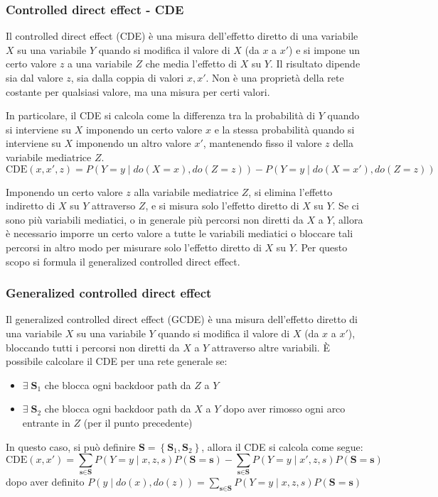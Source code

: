 \subsubsection*{Controlled direct effect - CDE}
Il controlled direct effect (CDE) è una misura dell'effetto diretto di una variabile \(X\) su una variabile \(Y\) quando si
modifica il valore di \(X\) (da \(x\) a \(x'\)) e si impone un certo valore \(z\) a una variabile \(Z\) che media l'effetto
di \(X\) su \(Y\). Il risultato dipende sia dal valore \(z\), sia dalla coppia di valori \(x, x'\). Non è una proprietà della
rete costante per qualsiasi valore, ma una misura per certi valori.

In particolare, il CDE si calcola come la differenza tra la probabilità di \(Y\) quando si interviene su \(X\) imponendo un
certo valore \(x\) e la stessa probabilità quando si interviene su \(X\) imponendo un altro valore \(x'\), mantenendo fisso
il valore \(z\) della variabile mediatrice \(Z\).
\[\text{CDE}(x, x',z) = P(Y = y \mid do(X = x), do(Z = z)) - P(Y = y \mid do(X = x'), do(Z = z))\]

Imponendo un certo valore \(z\) alla variabile mediatrice \(Z\), si elimina l'effetto indiretto di \(X\) su \(Y\) attraverso
\(Z\), e si misura solo l'effetto diretto di \(X\) su \(Y\). Se ci sono più variabili mediatici, o in generale più percorsi
non diretti da \(X\) a \(Y\), allora è necessario imporre un certo valore a tutte le variabili mediatici o bloccare tali
percorsi in altro modo per misurare solo l'effetto diretto di \(X\) su \(Y\). Per questo scopo si formula il generalized
controlled direct effect.

\subsubsection*{Generalized controlled direct effect}
Il generalized controlled direct effect (GCDE) è una misura dell'effetto diretto di una variabile \(X\) su una variabile \(Y\)
quando si modifica il valore di \(X\) (da \(x\) a \(x'\)), bloccando tutti i percorsi non diretti da \(X\) a \(Y\) attraverso
altre variabili. È possibile calcolare il CDE per una rete generale se:
\begin{itemize}
	\item \(\exists \; \textbf{S}_1\) che blocca ogni backdoor path da \(Z\) a \(Y\)
	\item \(\exists \; \textbf{S}_2\) che blocca ogni backdoor path da \(X\) a \(Y\) dopo aver rimosso ogni arco entrante
	in \(Z\) (per il punto precedente)
\end{itemize}
In questo caso, si può definire \(\textbf{S} = \left\{ \textbf{S}_1, \textbf{S}_2 \right\}\), allora il CDE si calcola come segue:
\[\text{CDE}(x, x') = \sum_{\textbf{s} \in \textbf{S}} P(Y = y \mid x, z, s) P(\textbf{S} = \textbf{s}) - \sum_{\textbf{s} \in \textbf{S}} P(Y = y \mid x', z, s) P(\textbf{S} = \textbf{s})\]
dopo aver definito \(P(y \mid do(x), do(z)) = \sum_{\textbf{s} \in \textbf{S}} P(Y = y \mid x, z, s) P(\textbf{S} = \textbf{s})\)

